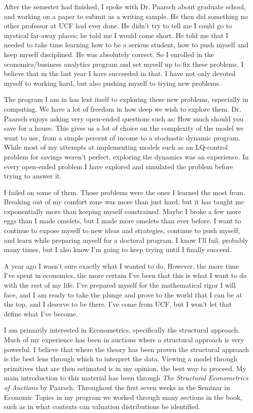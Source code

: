 \documentclass[10pt, a4paper]{article}
\begin{document}
After the semester had finished, I spoke with Dr. Paarsch about
graduate school, and working on a paper to submit as a writing
sample. He then did something no other professor at UCF had ever done.
He didn't try to tell me I could go to mystical far-away places; he
told me I would come short. He told me that I needed to take time
learning how to be a serious student, how to push myself and keep
myself disciplined. He was absolutely correct. So I enrolled in the
economics/business analytics program and set myself up to fix these
problems. I believe that in the last year I have succeeded in that. I
have not only devoted myself to working hard, but also pushing myself
to trying new problems.

The program I am in has lent itself to exploring these new problems,
especially in computing. We have a lot of freedom in how deep we wish
to explore them. Dr. Paarsch enjoys asking very open-ended questions
such as: How much should you save for a house. This gives us a lot of
choice on the complexity of the model we want to use, from a simple
percent of income to a stochastic dynamic program. While most of my
attempts at implementing models such as an LQ-control problem for
savings weren't perfect, exploring the dynamics was an experience. In
every open-ended problem I have explored and simulated the problem before
trying to answer it. 

I failed on some of them. Those problems were the ones I learned the
most from. Breaking out of my comfort zone was more than just hard,
but it has taught me exponentially more than keeping myself
constrained. Maybe I broke a few more eggs than I made omelets, but I
made more omelets than ever before. I want to continue to expose
myself to new ideas and strategies, continue to push myself, and learn
while preparing myself for a doctoral program. I know I'll fail,
probably many times, but I also know I'm going to keep trying until I
finally succeed.

A year ago I wasn't sure exactly what I wanted to do. However, the
more time I've spent in economics, the more certain I've been that
this is what I want to do with the rest of my life. I've prepared
myself for the mathematical rigor I will face, and I am ready to take
the plunge and prove to the world that I can be at the top, and I
deserve to be there. I've come from UCF, but I won't let that define
what I've become.

I am primarily interested in Econometrics, specifically the structural
approach. Much of my experience has been in auctions where a
structural approach is very powerful. I believe that where the theory
has been proven the structural approach is the best lens through which
to interpret the data. Viewing a model through primitives that are
then estimated is in my opinion, the best way to proceed. My main
introduction to this material has been through \emph{The Structural
Econometrics of Auctions} by Paarsch. Throughout the first seven weeks
in the Seminar in Economic Topics in my program we worked through many
sections in the book, such as in what contexts can valuation
distributions be identified.
\end{document}
